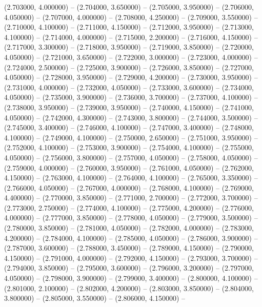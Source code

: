 (2.703000, 4.000000) -- 
(2.704000, 3.650000) -- 
(2.705000, 3.950000) -- 
(2.706000, 4.050000) -- 
(2.707000, 4.000000) -- 
(2.708000, 4.250000) -- 
(2.709000, 3.550000) -- 
(2.710000, 4.100000) -- 
(2.711000, 4.150000) -- 
(2.712000, 3.950000) -- 
(2.713000, 4.100000) -- 
(2.714000, 4.000000) -- 
(2.715000, 2.200000) -- 
(2.716000, 4.150000) -- 
(2.717000, 3.300000) -- 
(2.718000, 3.950000) -- 
(2.719000, 3.850000) -- 
(2.720000, 4.050000) -- 
(2.721000, 3.650000) -- 
(2.722000, 3.000000) -- 
(2.723000, 4.000000) -- 
(2.724000, 2.500000) -- 
(2.725000, 3.900000) -- 
(2.726000, 3.850000) -- 
(2.727000, 4.050000) -- 
(2.728000, 3.950000) -- 
(2.729000, 4.200000) -- 
(2.730000, 3.950000) -- 
(2.731000, 4.000000) -- 
(2.732000, 4.050000) -- 
(2.733000, 3.600000) -- 
(2.734000, 4.050000) -- 
(2.735000, 3.900000) -- 
(2.736000, 3.700000) -- 
(2.737000, 4.100000) -- 
(2.738000, 3.950000) -- 
(2.739000, 3.950000) -- 
(2.740000, 4.150000) -- 
(2.741000, 4.050000) -- 
(2.742000, 4.300000) -- 
(2.743000, 3.800000) -- 
(2.744000, 3.500000) -- 
(2.745000, 3.400000) -- 
(2.746000, 4.100000) -- 
(2.747000, 3.400000) -- 
(2.748000, 4.100000) -- 
(2.749000, 4.100000) -- 
(2.750000, 2.650000) -- 
(2.751000, 3.950000) -- 
(2.752000, 4.100000) -- 
(2.753000, 3.900000) -- 
(2.754000, 4.100000) -- 
(2.755000, 4.050000) -- 
(2.756000, 3.800000) -- 
(2.757000, 4.050000) -- 
(2.758000, 4.050000) -- 
(2.759000, 4.000000) -- 
(2.760000, 3.950000) -- 
(2.761000, 4.050000) -- 
(2.762000, 4.150000) -- 
(2.763000, 4.100000) -- 
(2.764000, 4.100000) -- 
(2.765000, 3.350000) -- 
(2.766000, 4.050000) -- 
(2.767000, 4.000000) -- 
(2.768000, 4.100000) -- 
(2.769000, 4.400000) -- 
(2.770000, 3.850000) -- 
(2.771000, 2.700000) -- 
(2.772000, 3.700000) -- 
(2.773000, 2.750000) -- 
(2.774000, 4.100000) -- 
(2.775000, 4.200000) -- 
(2.776000, 4.000000) -- 
(2.777000, 3.850000) -- 
(2.778000, 4.050000) -- 
(2.779000, 3.500000) -- 
(2.780000, 3.850000) -- 
(2.781000, 4.050000) -- 
(2.782000, 4.000000) -- 
(2.783000, 4.200000) -- 
(2.784000, 4.100000) -- 
(2.785000, 4.050000) -- 
(2.786000, 3.900000) -- 
(2.787000, 3.600000) -- 
(2.788000, 3.450000) -- 
(2.789000, 4.150000) -- 
(2.790000, 4.150000) -- 
(2.791000, 4.000000) -- 
(2.792000, 4.150000) -- 
(2.793000, 3.700000) -- 
(2.794000, 3.850000) -- 
(2.795000, 3.600000) -- 
(2.796000, 3.200000) -- 
(2.797000, 4.050000) -- 
(2.798000, 3.900000) -- 
(2.799000, 3.400000) -- 
(2.800000, 4.100000) -- 
(2.801000, 2.100000) -- 
(2.802000, 4.200000) -- 
(2.803000, 3.850000) -- 
(2.804000, 3.800000) -- 
(2.805000, 3.550000) -- 
(2.806000, 4.150000) -- 
